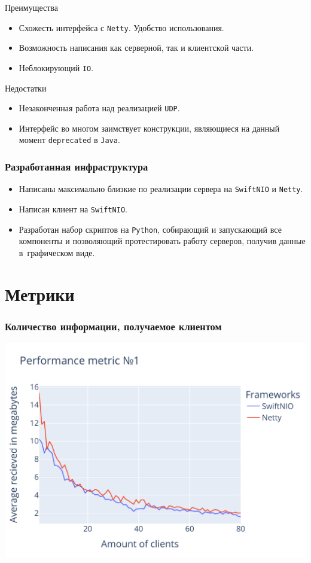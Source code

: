 \documentclass[10pt,xcolor={table,dvipsnames},t]{beamer}
\begin{document}
\smallframetitle

\begin{frame}{Преимущества}

\begin{itemize}
\item Схожесть интерфейса с \texttt{Netty}. Удобство использования. 
\item Возможность написания как серверной, так и клиентской части. 
\item Неблокирующий \texttt{IO}. 
\end{itemize}

\end{frame}

\begin{frame}{Недостатки}

\begin{itemize}
\item Незаконченная работа над реализацией \texttt{UDP}.
\item Интерфейс во многом заимствует конструкции, являющиеся на данный момент \texttt{deprecated} в \texttt{Java}. 
\end{itemize}

\end{frame}

\begin{frame}
\frametitle{Разработанная инфраструктура}

\begin{itemize}
\item Написаны максимально близкие по реализации сервера на \texttt{SwiftNIO} и \texttt{Netty}.
\item Написан клиент на \texttt{SwiftNIO}.
\item Разработан набор скриптов на \texttt{Python}, собирающий и запускающий все компоненты и позволяющий протестировать работу серверов, получив данные в~графическом виде.
\end{itemize}
\end{frame}

\section{Метрики}

\begin{frame}
\frametitle{Количество информации, получаемое клиентом}

\begin{center}
    \includegraphics[width=.65\textwidth,height=.65\textheight]{metric1_final.pdf}
\end{center}
\end{frame}
\end{document}
